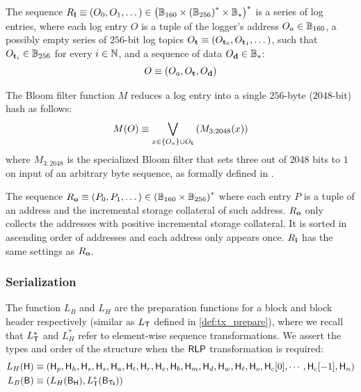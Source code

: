 The sequence $R_{\bf l}\equiv \left(O_0,O_1,\dots\right) \in \left(\mathbb{B}_{160} \times \left(\mathbb{B}_{256}\right)^*\times \mathbb{B}_*\right)^*$ is a series of log entries,
where each log entry $O$ is a tuple of the logger's address $O_a\in \mathbb{B}_{160}$,
a possibly empty series of $256$-bit log topics $O_{\bf t}\equiv \left(O_{{\bf t}_0}, O_{{\bf t}_1},\dots \right)$, such that $O_{{\bf t}_i}\in\mathbb{B}_{256}$ for every $i\in\mathbb{N}$,
and a sequence of data $O_{\bf d}\in\mathbb{B}_*$:
\begin{align}
	O\equiv \left( O_a, O_{\bf t}, O_{\bf d} \right)
\end{align}

The Bloom filter function $M$ reduces a log entry into a single $256$-byte ($2048$-bit) hash as follows:
\begin{align}
 	M(O)\equiv \bigvee_{x\in{\left \{{O_a} \right \}}\cup O_{\bf t}}\left( M_{3:2048}(x) \right)
\end{align} 
where $M_{3:2048}$ is the specialized Bloom filter that sets three out of $2048$ bits to $1$ on input of an arbitrary byte sequence,
as formally defined in \cite{ETH_yellow}.

The sequence $R_{\bf o}\equiv \left(P_0,P_1,\dots\right) \in \left(\mathbb{B}_{160} \times \mathbb{B}_{256}\right)^*$ where each entry $P$ is a tuple of an address and the incremental storage collateral of such address. $R_{\bf o}$ only collects the addresses with positive incremental storage collateral. It is sorted in ascending order of addresses and each address only appears once. $R_{\bf i}$ has the same settings as $R_{\bf o}$.

\subsubsection{Serialization}

The function $L_B$ and $L_H$ are the preparation functions for a block and block header respectively (similar as $L_{\textsf{T}}$ defined in \cref{def:tx_prepare}),
where we recall that $L_{\textsf{T}}^*$ and $L_H^*$ refer to element-wise sequence transformations.
We assert the types and order of the structure when the $\mathsf{RLP}$ transformation is required:
%
\begin{align}
	L_H(\textsf{H}) &\equiv \left(\textsf{H}_p,\textsf{H}_h,\textsf{H}_s,\textsf{H}_s,\textsf{H}_a,\textsf{H}_t,\textsf{H}_r,\textsf{H}_e,\textsf{H}_b,\textsf{H}_m,\textsf{H}_d,\textsf{H}_w,\textsf{H}_\ell,\textsf{H}_o,\textsf{H}_c[0],\cdots,\textsf{H}_c[-1],\textsf{H}_n\right)\\
	L_B(\textsf{B}) &\equiv \left( L_H(\textsf{B}_{\textsf{H}}), L_{\textsf{T}}^*(\textsf{B}_{\textsf{Ts}}) \right)
\end{align}

